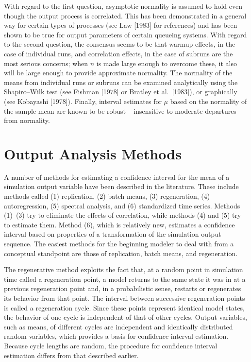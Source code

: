 With regard to the first question, asymptotic normality is assumed to hold
even though the output process is correlated. This has been demonstrated in a
general way for certain types of processes (see Law [1983] for references) and
has been shown to be true for output parameters of certain queueing systems.
With regard to the second question, the consensus seems to be that warmup
effects, in the case of individual runs, and correlation effects, in the case
of subruns are the most serious concerns; when $n$ is made large enough to
overcome these, it also will be large enough to provide approximate
normality. The normality of the means from individual runs or subruns can be
examined analytically using the Shapiro--Wilk test (see Fishman [1978] or
Bratley et al.\ [1983]), or graphically (see Kobayashi [1978]). Finally,
interval estimates for $\mu$ based on the normality of the sample mean are
known to be robust -- insensitive to moderate departures from normality.

\section{Output Analysis Methods}
\label{sec:output-analysis-methods}

A number of methods for estimating a confidence interval for the mean of a
simulation output variable have been described in the literature. These
include methods called (1) replication, (2) batch means, (3) regeneration,
(4) autoregression, (5) spectral analysis, and (6) standardized time series.
Methods (1)--(3) try to eliminate the effects of correlation, while methods
(4) and (5) try to estimate them. Method (6), which is relatively new,
estimates a confidence interval based on properties of a transformation of the
simulation output sequence. The easiest methods for the beginning modeler to
deal with from a conceptual standpoint are those of replication, batch means,
and regeneration.

The regenerative method exploits the fact that, at a random point in
simulation time called a regeneration point, a model returns to the same state
it was in at a previous regeneration point and, in a probabilistic sense,
restarts or regenerates its behavior from that point. The interval between
successive regeneration points is called a regeneration cycle. Since these
points represent identical model states, the behavior of one cycle is
independent of that of other cycles. Output variables, such as means, of
different cycles are independent and identically distributed random
variables, which provides a basis for confidence interval estimation. Because
cycle lengths are random, the procedure for confidence interval estimation
differs from that described earlier.

